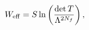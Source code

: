 \begin{equation}\label{Eq:Weff}
W_{\rm eff}=S 
\ln\left(
\frac{
	\det T
}
{
	\Lambda^{2N_f}
}
\right),
\end{equation}

